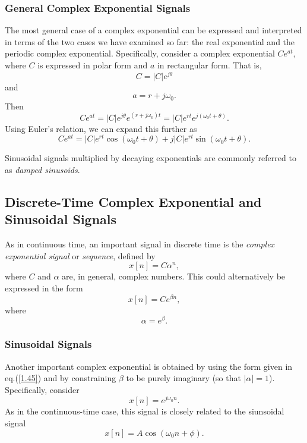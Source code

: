 \documentclass[a4paper,10pt,twoside]{book}
\begin{document}
\subsubsection{General Complex Exponential Signals}

The most general case of a complex exponential can be expressed and interpreted in terms of the two cases we have examined so far: the real exponential and the periodic complex exponential. Specifically, consider a complex exponential $Ce^{at}$, where $C$ is expressed in polar form and $a$ in rectangular form. That is, $$C=|C|e^{j\theta}$$ and $$a=r+j\omega_0.$$ Then
\begin{equation}
    Ce^{at} = |C|e^{j\theta}e^{(r+j\omega_{0})t} = |C|e^{rt}e^{j(\omega_{0}t+\theta)}.
    \label{1.42}
\end{equation}
Using Euler's relation, we can expand this further as
\begin{equation}
    Ce^{at} = \big|C\big|e^{rt}\cos(\omega_{0}t+\theta)+ j\big|C\big|e^{rt}\sin(\omega_{0}t+\theta).
    \label{1.43}
\end{equation}

Sinusoidal signals multiplied by decaying exponentials are commonly referred to as \textit{damped sinusoids}.

\subsection{Discrete-Time Complex Exponential and Sinusoidal Signals}

As in continuous time, an important signal in discrete time is the \textit{complex exponential signal} or \textit{sequence}, defined by
\begin{equation}
    x[n]=C\alpha^n,
    \label{1.44}
\end{equation}
where $C$ and $\alpha$ are, in general, complex numbers. This could alternatively be expressed in the form
\begin{equation}
    x[n]=Ce^{\beta n},
    \label{1.45}
\end{equation}
where $$\alpha=e^{\beta}.$$

\subsubsection{Sinusoidal Signals}

Another important complex exponential is obtained by using the form given in eq.\;(\ref{1.45}) and by constraining $\beta$ to be purely imaginary (so that $|\alpha|=1$). Specifically, consider
\begin{equation}
    x[n]=e^{j\omega_0 n}.
    \label{1.46}
\end{equation}
As in the continuous-time case, this signal is closely related to the siunsoidal signal
\begin{equation}
    x[n]=A\cos(\omega_0n+\phi).
    \label{1.47}
\end{equation}
\end{document}
